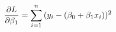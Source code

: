 \documentclass[preview]{standalone}
\begin{document}
\begin{align*}
\special{dvisvgm:raw <g id='unique000'>}\frac{\partial L}{\partial \beta_1} = \sum_{i=1}^n{(y_i-(\beta_0+\beta_1 x_i)})^2\special{dvisvgm:raw </g>}
\end{align*}
\end{document}
